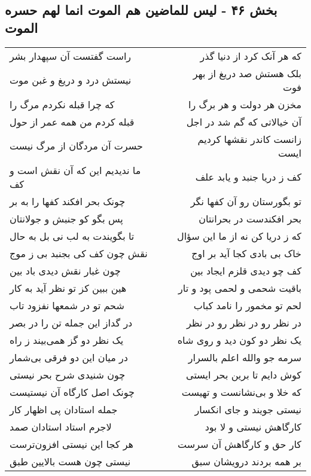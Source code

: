 \begin{center}
\section*{بخش ۴۶ - لیس للماضین هم الموت انما لهم حسره الموت}
\label{sec:sh046}
\begin{longtable}{l p{0.5cm} r}
راست گفتست آن سپهدار بشر
&&
که هر آنک کرد از دنیا گذر
\\
نیستش درد و دریغ و غبن موت
&&
بلک هستش صد دریغ از بهر فوت
\\
که چرا قبله نکردم مرگ را
&&
مخزن هر دولت و هر برگ را
\\
قبله کردم من همه عمر از حول
&&
آن خیالاتی که گم شد در اجل
\\
حسرت آن مردگان از مرگ نیست
&&
زانست کاندر نقشها کردیم ایست
\\
ما ندیدیم این که آن نقش است و کف
&&
کف ز دریا جنبد و یابد علف
\\
چونک بحر افکند کفها را به بر
&&
تو بگورستان رو آن کفها نگر
\\
پس بگو کو جنبش و جولانتان
&&
بحر افکندست در بحرانتان
\\
تا بگویندت به لب نی بل به حال
&&
که ز دریا کن نه از ما این سؤال
\\
نقش چون کف کی بجنبد بی ز موج
&&
خاک بی بادی کجا آید بر اوج
\\
چون غبار نقش دیدی باد بین
&&
کف چو دیدی قلزم ایجاد بین
\\
هین ببین کز تو نظر آید به کار
&&
باقیت شحمی و لحمی پود و تار
\\
شحم تو در شمعها نفزود تاب
&&
لحم تو مخمور را نامد کباب
\\
در گداز این جمله تن را در بصر
&&
در نظر رو در نظر رو در نظر
\\
یک نظر دو گز همی‌بیند ز راه
&&
یک نظر دو کون دید و روی شاه
\\
در میان این دو فرقی بی‌شمار
&&
سرمه جو والله اعلم بالسرار
\\
چون شنیدی شرح بحر نیستی
&&
کوش دایم تا برین بحر ایستی
\\
چونک اصل کارگاه آن نیستیست
&&
که خلا و بی‌نشانست و تهیست
\\
جمله استادان پی اظهار کار
&&
نیستی جویند و جای انکسار
\\
لاجرم استاد استادان صمد
&&
کارگاهش نیستی و لا بود
\\
هر کجا این نیستی افزون‌ترست
&&
کار حق و کارگاهش آن سرست
\\
نیستی چون هست بالایین طبق
&&
بر همه بردند درویشان سبق
\\

\end{longtable}
\end{center}
